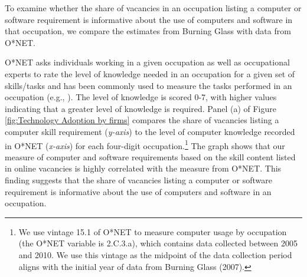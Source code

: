 \documentclass[12pt]{article}
\begin{document}
To examine whether the share of vacancies in an occupation listing a computer or software requirement is informative about the use of computers and software in that occupation, we compare the estimates
from Burning Glass with data from O{*}NET. {O{*}NET asks individuals working in a given occupation as well as occupational experts to rate the level of knowledge needed in an occupation for a given set of skills/tasks and has been commonly used to measure the tasks performed in an occupation (e.g., \citet{acemoglu2011skills}). The level of knowledge is scored 0-7, with higher values indicating that a greater level of knowledge is required. Panel (a) of Figure \ref{fig:Technology Adoption by firms} compares the share of vacancies listing a computer skill requirement (\textit{y-axis}) to the level of computer knowledge recorded in O{*}NET (\textit{x-axis}) for each four-digit occupation.\footnote{We use vintage 15.1 of O*NET to measure computer usage by occupation (the O*NET variable is 2.C.3.a), which contains data collected between 2005 and 2010. We use this vintage as the midpoint of the data collection period aligns with the initial year of data from Burning Glass (2007).} The graph shows that our measure of computer and software requirements based on the skill content listed in online vacancies is highly correlated with the measure from O{*}NET. This finding suggests that the share of vacancies listing a computer or software requirement is informative about the use of computers and software in an occupation. %

}
\end{document}
